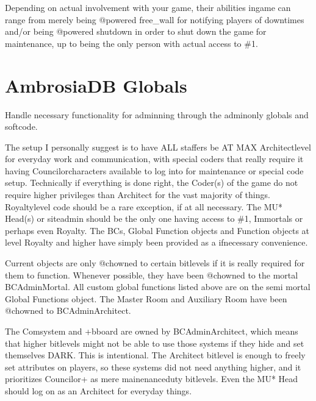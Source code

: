\documentclass[letterpaper,10pt,english]{sphinxmanual}
\begin{document}
\sphinxAtStartPar
Depending on actual involvement with your game, their abilities
in\sphinxhyphen{}game can range from merely being @powered free\_wall for
notifying players of downtimes and/or being @powered shutdown in
order to shut down the game for maintenance, up to being the
only person with actual access to \#1.


\section{AmbrosiaDB Globals}
\label{\detokenize{ambrosiadb:ambrosiadb-globals}}
\sphinxAtStartPar
Handle necessary functionality for adminning through the admin\sphinxhyphen{}only globals and
softcode.

\sphinxAtStartPar
The setup I personally suggest is to have ALL staffers be AT MAX Architect\sphinxhyphen{}level
for everyday work and communication, with special coders that \sphinxhyphen{}really\sphinxhyphen{} require
it having Councilor\sphinxhyphen{}characters available to log into for maintenance or special
code setup. Technically if everything is done right, the Coder(s) of the game do
not require higher privileges than Architect for the vast majority of things.
Royalty\sphinxhyphen{}level code should be a rare exception, if at all necessary. The MU*
Head(s) or site\sphinxhyphen{}admin should be the only one having access to \#1, Immortals or
perhaps even Royalty. The BC\textquotesingle{}s, Global Function objects and Function objects at
level Royalty and higher have simply been provided as a if\sphinxhyphen{}necessary convenience.

\sphinxAtStartPar
Current objects are only @chowned to certain bitlevels if it is really required
for them to function. Whenever possible, they have been @chowned to the mortal
BC\sphinxhyphen{}Admin\sphinxhyphen{}Mortal. All custom global functions listed above are on the semi\sphinxhyphen{}
\sphinxhyphen{}mortal Global Functions object. The Master Room and Auxiliary Room have been
@chowned to BC\sphinxhyphen{}Admin\sphinxhyphen{}Architect.

\sphinxAtStartPar
The Comsystem and +bboard are owned by BC\sphinxhyphen{}Admin\sphinxhyphen{}Architect, which means that
higher bitlevels might not be able to use those systems if they hide and set
themselves DARK. This is intentional. The Architect bitlevel is enough to freely
set attributes on players, so these systems did not need anything higher, and
it prioritizes Councilor+ as mere mainenance\sphinxhyphen{}duty bitlevels. Even the MU* Head
should log on as an Architect for everyday things.
\end{document}

